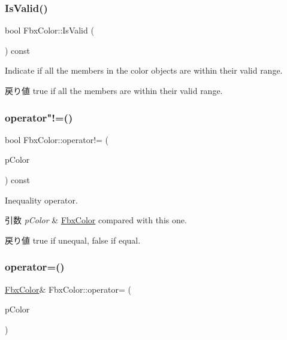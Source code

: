 \subsubsection{\texorpdfstring{Is\+Valid()}{IsValid()}}
{\footnotesize\ttfamily bool Fbx\+Color\+::\+Is\+Valid (\begin{DoxyParamCaption}{ }\end{DoxyParamCaption}) const}

Indicate if all the members in the color objects are within their valid range. \begin{DoxyReturn}{戻り値}
{\ttfamily true} if all the members are within their valid range. 
\end{DoxyReturn}
\mbox{\label{class_fbx_color_a3f7caa78c7c9140670ad4a5f1cc32b62}} 
\subsubsection{\texorpdfstring{operator"!=()}{operator!=()}}
{\footnotesize\ttfamily bool Fbx\+Color\+::operator!= (\begin{DoxyParamCaption}\item[{const \hyperlink{class_fbx_color}{Fbx\+Color} \&}]{p\+Color }\end{DoxyParamCaption}) const}

Inequality operator. 
\begin{DoxyParams}{引数}
{\em p\+Color} & \hyperlink{class_fbx_color}{Fbx\+Color} compared with this one. \\
\hline
\end{DoxyParams}
\begin{DoxyReturn}{戻り値}
{\ttfamily true} if unequal, {\ttfamily false} if equal. 
\end{DoxyReturn}
\mbox{\label{class_fbx_color_ae1810b5b2286fa939f106e8d5adc5011}} 
\subsubsection{\texorpdfstring{operator=()}{operator=()}\hspace{0.1cm}{\footnotesize\ttfamily [1/3]}}
{\footnotesize\ttfamily \hyperlink{class_fbx_color}{Fbx\+Color}\& Fbx\+Color\+::operator= (\begin{DoxyParamCaption}\item[{const \hyperlink{class_fbx_color}{Fbx\+Color} \&}]{p\+Color }\end{DoxyParamCaption})}

